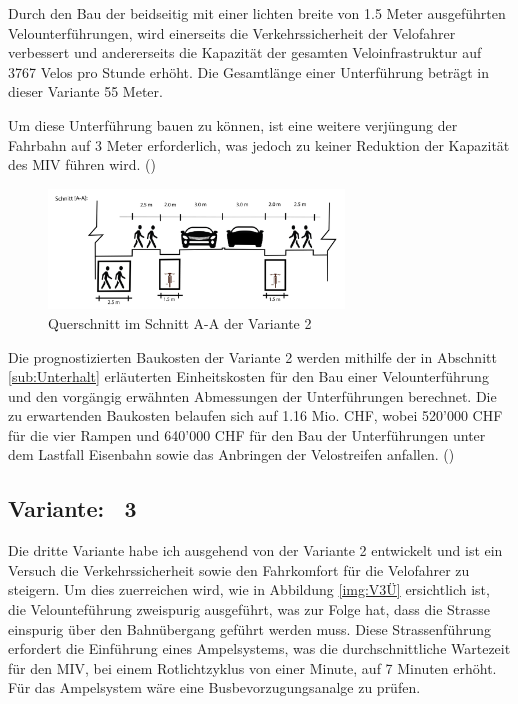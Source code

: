 Durch den Bau der beidseitig mit einer lichten breite von 1.5 Meter ausgeführten Velounterführungen, wird einerseits die Verkehrssicherheit der Velofahrer verbessert und andererseits die Kapazität der gesamten Veloinfrastruktur auf 3767 Velos pro Stunde erhöht. Die Gesamtlänge einer Unterführung beträgt in dieser Variante 55 Meter. 

Um diese Unterführung bauen zu können, ist eine weitere verjüngung der Fahrbahn auf 3 Meter erforderlich, was jedoch zu keiner Reduktion der Kapazität des MIV führen wird.  (\cite{Nacto2018})

\begin{figure}[h!]
	\centering
	\includegraphics[width=0.7\textwidth]{figures/f-04-05-02-b-V2}
	\caption[Querschnitt Variante 2]{Querschnitt im Schnitt A-A der Variante 2}
	\label{img:V2Q}
\end{figure}

Die prognostizierten Baukosten der Variante 2 werden mithilfe der in Abschnitt \ref{sub:Unterhalt} erläuterten Einheitskosten für den Bau einer Velounterführung und den vorgängig erwähnten Abmessungen der Unterführungen berechnet. Die zu erwartenden Baukosten belaufen sich auf 1.16 Mio. CHF, wobei 520'000 CHF für die vier Rampen und 640'000 CHF für den Bau der Unterführungen unter dem Lastfall Eisenbahn sowie das Anbringen der Velostreifen anfallen. (\cite{Baukosten2010}) 

\pagebreak

\subsection{Variante: \ 3}
\label{subsec:V3}

Die dritte Variante habe ich ausgehend von der Variante 2 entwickelt und ist ein Versuch die Verkehrssicherheit sowie den Fahrkomfort für die Velofahrer zu steigern. Um dies zuerreichen wird, wie in Abbildung \ref{img:V3Ü} ersichtlich ist, die Velounteführung zweispurig ausgeführt, was zur Folge hat, dass die Strasse einspurig über den Bahnübergang geführt werden muss. Diese Strassenführung erfordert die Einführung eines Ampelsystems, was die durchschnittliche Wartezeit für den MIV, bei einem Rotlichtzyklus von einer Minute, auf 7 Minuten erhöht. Für das Ampelsystem wäre eine Busbevorzugungsanalge zu prüfen. \\

